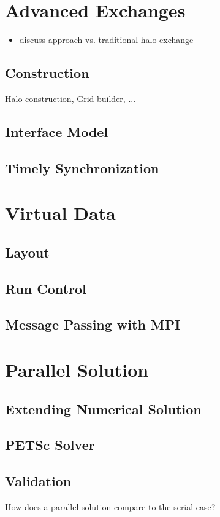 \chapter{Advanced Exchanges}

\begin{itemize}
\item discuss approach vs. traditional halo exchange
\end{itemize}
\section{Construction}
Halo construction, Grid builder, ...
\section{Interface Model}
\section{Timely Synchronization}

\chapter{Virtual Data}

\section{Layout}
\section{Run Control}
\section{Message Passing with MPI}

\chapter{Parallel Solution}

\section{Extending Numerical Solution}
\section{PETSc Solver}
\section{Validation}
How does a parallel solution compare to the serial case?

